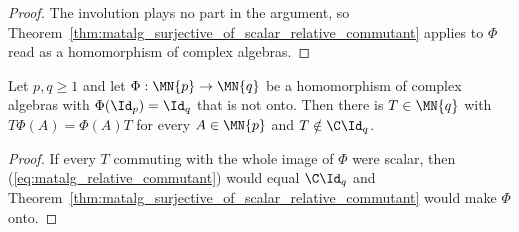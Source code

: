 \begin{proof}\leanok
    The involution plays no part in the argument, so
    Theorem~\ref{thm:matalg_surjective_of_scalar_relative_commutant}
    applies to $\Phi$ read as a homomorphism of complex algebras.
\end{proof}

\begin{theorem}
    \label{thm:matalg_nonscalar_relative_commutant}
    \leanok
    Let $p,q\geq1$ and let $\Phi:\MN{p}\to\MN{q}$ be a homomorphism of
    complex algebras with $\Phi(\Id_p)=\Id_q$ that is not onto.  Then there
    is $T\in\MN{q}$ with $T\Phi(A)=\Phi(A)T$ for every $A\in\MN{p}$ and
    $T\notin\C\Id_q$.
\end{theorem}

\begin{proof}\leanok
    If every $T$ commuting with the whole image of $\Phi$ were scalar, then
    (\ref{eq:matalg_relative_commutant}) would equal $\C\Id_q$ and
    Theorem~\ref{thm:matalg_surjective_of_scalar_relative_commutant} would
    make $\Phi$ onto.
\end{proof}

